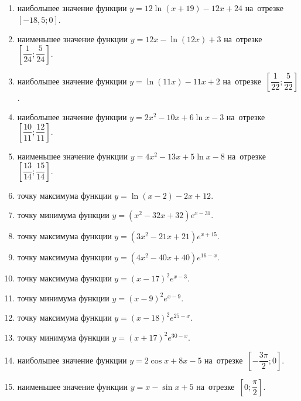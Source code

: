 \documentclass[a4paper,10pt]{article}
\begin{document}
\begin{enumerate}
\item {} наибольшее значение функции $y = 12\ln \left(x+19\right)-12x +24$ на~отрезке~$\left[-18,5;0\right]$.

\item {} наименьшее значение функции $y=12x-\ln \left(12x\right)+3$ на~отрезке~$\left[\dfrac{1}{24};\dfrac{5}{24}\right]$.

\item {} наибольшее значение функции $y=\ln \left(11x\right)-11x+2$ на~отрезке~$\left[\dfrac{1}{22};\dfrac{5}{22}\right]$.

\item {} наибольшее значение функции $y=2x^2-10x+6\ln x-3$ на~отрезке~$\left[\dfrac{10}{11};\dfrac{12}{11}\right]$.

\item {} наименьшее значение функции $y=4x^2-13x+5\ln x-8$ на~отрезке~$\left[\dfrac{13}{14};\dfrac{15}{14}\right]$.

\item {} точку максимума функции $y=\ln \left(x-2\right)-2x+12$.

\item {} точку минимума функции $y=\left(x^2-32x+32\right)e^{x-31}$.

\item {} точку максимума функции $y=\left(3x^2-21x+21\right)e^{x+15}$.

\item {} точку максимума функции $y=\left(4x^2-40x+40\right)e^{16-x}$.

\item {} точку максимума функции $y=\left(x -17\right)^2e^{x-3}$.

\item {} точку минимума функции $y=\left(x -9\right)^2e^{x-9}$.

\item {} точку максимума функции $y=\left(x -18\right)^2e^{25-x}$.

\item {} точку минимума функции $y=\left(x +17\right)^2e^{30-x}$.

\item {} наибольшее значение функции $y=2\cos x+8x -5$ на~отрезке~$\left[-\dfrac{3\pi }{2};0\right]$.

\item {} наименьшее значение функции $y=x-\sin x +5$ на~отрезке~$\left[0;\dfrac{\pi }{2}\right]$.


\end{enumerate}
\end{document}
